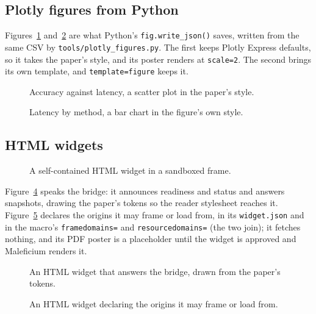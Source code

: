 \documentclass{article}
\theoremstyle{definition}
\begin{document}
\subsection{Plotly figures from Python}
Figures~\ref{fig:plotly-tradeoff} and~\ref{fig:plotly-latency} are what
Python's \texttt{fig.write\_json()} saves, written from the same CSV by
\texttt{tools/plotly\_figures.py}. The first keeps Plotly Express defaults,
so it takes the paper's style, and its poster renders at \texttt{scale=2}.
The second brings its own template, and
\texttt{template=figure} keeps it.
\begin{figure}[ht]
\centering
\caption{Accuracy against latency, a scatter plot in the paper's style.}
\label{fig:plotly-tradeoff}
\end{figure}
\begin{figure}[ht]
\centering
\caption{Latency by method, a bar chart in the figure's own style.}
\label{fig:plotly-latency}
\end{figure}

\subsection{HTML widgets}
\begin{figure}[ht]
\centering
\caption{A self-contained HTML widget in a sandboxed frame.}
\label{fig:html}
\end{figure}

Figure~\ref{fig:bridge} speaks the bridge: it announces readiness and
status and answers snapshots, drawing the paper's tokens so the reader
stylesheet reaches it. Figure~\ref{fig:framed} declares the origins it may
frame or load from, in its \texttt{widget.json} and in the macro's
\texttt{framedomains=} and \texttt{resourcedomains=} (the two join); it
fetches nothing, and its PDF poster is a placeholder until the widget is
approved and Maleficium renders it.
\begin{figure}[ht]
\centering
\caption{An HTML widget that answers the bridge, drawn from the paper's tokens.}
\label{fig:bridge}
\end{figure}
\begin{figure}[ht]
\centering
\caption{An HTML widget declaring the origins it may frame or load from.}
\label{fig:framed}
\end{figure}
\end{document}

